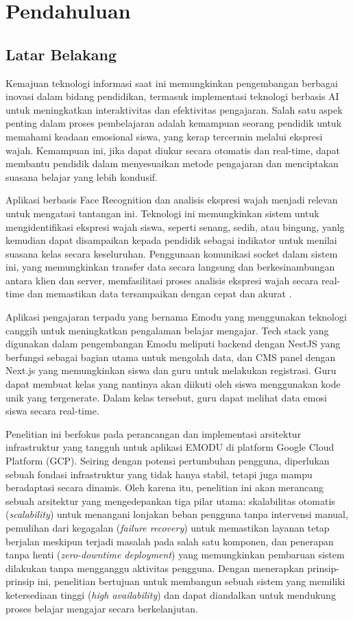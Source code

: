 \chapter{Pendahuluan}
\section{Latar Belakang}
\qquad Kemajuan teknologi informasi saat ini memungkinkan pengembangan berbagai inovasi dalam bidang pendidikan, termasuk implementasi teknologi berbasis AI untuk meningkatkan interaktivitas dan efektivitas pengajaran.
Salah satu aspek penting dalam proses pembelajaran adalah kemampuan seorang pendidik untuk memahami keadaan emosional siswa, yang kerap tercermin melalui ekspresi wajah.
Kemampuan ini, jika dapat diukur secara otomatis dan real-time, dapat membantu pendidik dalam menyesuaikan metode pengajaran dan menciptakan suasana belajar yang lebih kondusif.

Aplikasi berbasis Face Recognition dan analisis ekspresi wajah menjadi relevan untuk mengatasi tantangan ini.
Teknologi ini memungkinkan sistem untuk mengidentifikasi ekspresi wajah siswa, seperti senang, sedih, atau bingung, yanlg kemudian dapat disampaikan kepada pendidik sebagai indikator untuk menilai suasana kelas secara keseluruhan.
Penggunaan komunikasi socket dalam sistem ini, yang memungkinkan transfer data secara langsung dan berkesinambungan antara klien dan server, memfasilitasi proses analisis ekspresi wajah secara real-time dan memastikan data tersampaikan dengan cepat dan akurat \parencite{ogundeyiWebSocketRealTime2019}.

Aplikasi pengajaran terpadu yang bernama Emodu yang menggunakan teknologi canggih untuk meningkatkan pengalaman belajar mengajar.
Tech stack yang digunakan dalam pengembangan Emodu meliputi backend dengan NestJS yang berfungsi sebagai bagian utama untuk mengolah data, dan CMS panel dengan Next.js yang memungkinkan siswa dan guru untuk melakukan registrasi.
Guru dapat membuat kelas yang nantinya akan diikuti oleh siswa menggunakan kode unik yang tergenerate.
Dalam kelas tersebut, guru dapat melihat data emosi siswa secara real-time.

Penelitian ini berfokus pada perancangan dan implementasi arsitektur infrastruktur yang tangguh untuk aplikasi EMODU di platform Google Cloud Platform (GCP).
Seiring dengan potensi pertumbuhan pengguna, diperlukan sebuah fondasi infrastruktur yang tidak hanya stabil, tetapi juga mampu beradaptasi secara dinamis.
Oleh karena itu, penelitian ini akan merancang sebuah arsitektur yang mengedepankan tiga pilar utama: skalabilitas otomatis (\textit{scalability}) untuk menangani lonjakan beban pengguna tanpa intervensi manual, pemulihan dari kegagalan (\textit{failure recovery}) untuk memastikan layanan tetap berjalan meskipun terjadi masalah pada salah satu komponen, dan penerapan tanpa henti (\textit{zero-downtime deployment}) yang memungkinkan pembaruan sistem dilakukan tanpa mengganggu aktivitas pengguna.
Dengan menerapkan prinsip-prinsip ini, penelitian bertujuan untuk membangun sebuah sistem yang memiliki ketersediaan tinggi (\textit{high availability}) dan dapat diandalkan untuk mendukung proses belajar mengajar secara berkelanjutan.

